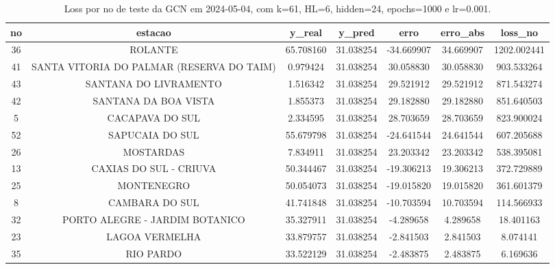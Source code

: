 \begin{table}[h]
\centering
\caption{Loss por no de teste da GCN em 2024-05-04, com k=61, HL=6, hidden=24, epochs=1000 e lr=0.001.}
\label{tab:gcn_loss_k61_hl6_h24_e1000_d20240504}
\begin{tabular}{ccccccc}
\toprule
no & estacao & y\_real & y\_pred & erro & erro\_abs & loss\_no \\
\midrule
36 & ROLANTE & 65.708160 & 31.038254 & -34.669907 & 34.669907 & 1202.002441 \\
41 & SANTA VITORIA DO PALMAR (RESERVA DO TAIM) & 0.979424 & 31.038254 & 30.058830 & 30.058830 & 903.533264 \\
43 & SANTANA DO LIVRAMENTO & 1.516342 & 31.038254 & 29.521912 & 29.521912 & 871.543274 \\
42 & SANTANA DA BOA VISTA & 1.855373 & 31.038254 & 29.182880 & 29.182880 & 851.640503 \\
5 & CACAPAVA DO SUL & 2.334595 & 31.038254 & 28.703659 & 28.703659 & 823.900024 \\
52 & SAPUCAIA DO SUL & 55.679798 & 31.038254 & -24.641544 & 24.641544 & 607.205688 \\
26 & MOSTARDAS & 7.834911 & 31.038254 & 23.203342 & 23.203342 & 538.395081 \\
13 & CAXIAS DO SUL - CRIUVA & 50.344467 & 31.038254 & -19.306213 & 19.306213 & 372.729889 \\
25 & MONTENEGRO & 50.054073 & 31.038254 & -19.015820 & 19.015820 & 361.601379 \\
8 & CAMBARA DO SUL & 41.741848 & 31.038254 & -10.703594 & 10.703594 & 114.566933 \\
32 & PORTO ALEGRE - JARDIM BOTANICO & 35.327911 & 31.038254 & -4.289658 & 4.289658 & 18.401163 \\
23 & LAGOA VERMELHA & 33.879757 & 31.038254 & -2.841503 & 2.841503 & 8.074141 \\
35 & RIO PARDO & 33.522129 & 31.038254 & -2.483875 & 2.483875 & 6.169636 \\
\bottomrule
\end{tabular}
\end{table}
